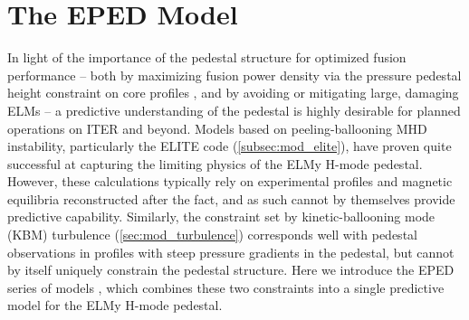 \nicesectionending

\section{The EPED Model}\label{sec:mod_eped}

In light of the importance of the pedestal structure for optimized fusion performance -- both by maximizing fusion power density via the pressure pedestal height constraint on core profiles \cite{Kinsey2011}, and by avoiding or mitigating large, damaging ELMs \cite{Loarte2003,Federici2003} -- a predictive understanding of the pedestal is highly desirable for planned operations on ITER and beyond.  Models based on peeling-ballooning MHD instability, particularly the ELITE code (\cref{subsec:mod_elite}), have proven quite successful at capturing the limiting physics of the ELMy H-mode pedestal.  However, these calculations typically rely on experimental profiles and magnetic equilibria reconstructed after the fact, and as such cannot by themselves provide predictive capability.  Similarly, the constraint set by kinetic-ballooning mode (KBM) turbulence (\cref{sec:mod_turbulence}) corresponds well with pedestal observations in profiles with steep pressure gradients in the pedestal, but cannot by itself uniquely constrain the pedestal structure.  Here we introduce the EPED series of models \cite{Snyder2011}, which combines these two constraints into a single predictive model for the ELMy H-mode pedestal.

